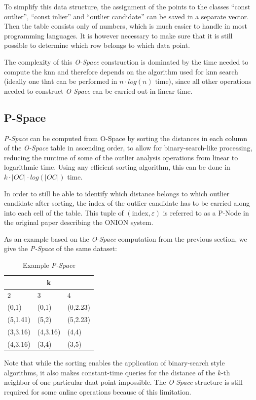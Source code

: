 \documentclass[runningheads]{llncs}
\begin{document}
To simplify this data structure, the assignment of the points to the classes ``const outlier'', ``const inlier'' and ``outlier candidate'' can be saved in a separate vector. Then the table consists only of numbers, which is much easier to handle in most programming languages. It is however necessary to make sure that it is still possible to determine which row belongs to which data point. 

The complexity of this \emph{O-Space} construction is dominated by the time needed to compute the knn and therefore depends on the algorithm used for knn search (ideally one that can be performed in $n \cdot log(n)$ time), since all other operations needed to construct \emph{O-Space} can be carried out in linear time.
\subsection{P-Space}
\emph{P-Space} can be computed from O-Space by sorting the distances in each column of the \emph{O-Space} table in ascending order, to allow for binary-search-like processing, reducing the runtime of some of the outlier analysis operations from linear to logarithmic time. Using any efficient sorting algorithm, this can be done in $k \cdot |OC| \cdot log(|OC|)$ time. 

In order to still be able to identify which distance belongs to which outlier candidate after sorting, the index of the outlier candidate has to be carried along into each cell of the table. This tuple of $(\text{index},\varepsilon)$ is referred to as a P-Node in the original paper \cite{onion} describing the ONION system.

As an example based on the \emph{O-Space} computation from the previous section, we give the \emph{P-Space} of the same dataset:
\begin{table}
\centering
\caption{Example \emph{P-Space}}
\begin{tabular} {| l | l | l |}
\hline
\multicolumn{3}{|c|}{k}\\
\hline
2 & 3 & 4\\
\hline
(0,1) & (0,1) & (0,2.23) \\
(5,1.41) & (5,2) & (5,2.23)\\
(3,3.16) & (4,3.16)  & (4,4)  \\
(4,3.16) & (3,4)  & (3,5)\\
\hline
\end{tabular}
\end{table}

Note that while the sorting enables the application of binary-search style algorithms, it also makes constant-time queries for the distance of the $k$-th neighbor of one particular daat point impossible. The \emph{O-Space} structure is still required for some online operations because of this limitation.
\end{document}
